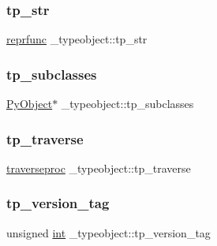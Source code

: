 \subsubsection{\texorpdfstring{tp\_str}{tp\_str}}
{\footnotesize\ttfamily \mbox{\hyperlink{_python27_2object_8h_a880e8271f8f3f984e0baecc0255c312f}{reprfunc}} \+\_\+typeobject\+::tp\+\_\+str}

\mbox{\label{struct__typeobject_acae460bf5a2aa21095f31534d95d88e4}} 
\subsubsection{\texorpdfstring{tp\_subclasses}{tp\_subclasses}}
{\footnotesize\ttfamily \mbox{\hyperlink{_python27_2object_8h_aadc84ac7aed2cfa6f20c25f62bf3dac7}{Py\+Object}}$\ast$ \+\_\+typeobject\+::tp\+\_\+subclasses}

\mbox{\label{struct__typeobject_a29532c271d34df9363d7b174ab78d397}} 
\subsubsection{\texorpdfstring{tp\_traverse}{tp\_traverse}}
{\footnotesize\ttfamily \mbox{\hyperlink{_python27_2object_8h_a295a4db00c5ed61ab35c42c919448166}{traverseproc}} \+\_\+typeobject\+::tp\+\_\+traverse}

\mbox{\label{struct__typeobject_a20cd8f5be5b4df827007c6a76112531f}} 
\subsubsection{\texorpdfstring{tp\_version\_tag}{tp\_version\_tag}}
{\footnotesize\ttfamily unsigned \mbox{\hyperlink{warnings_8h_a74f207b5aa4ba51c3a2ad59b219a423b}{int}} \+\_\+typeobject\+::tp\+\_\+version\+\_\+tag}

\mbox{\label{struct__typeobject_aeb30a09b1547d3ee33eba050b34f28b6}} 
